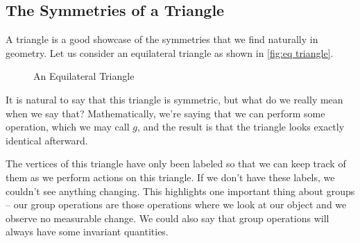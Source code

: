 \subsection{The Symmetries of a Triangle}
A triangle is a good showcase of the symmetries that we find naturally in geometry. Let us consider an equilateral triangle as shown in \autoref{fig:eq triangle}.

\begin{figure}[H]
    \centering



    \caption{An Equilateral Triangle}
    \label{fig:eq triangle}
\end{figure}

It is natural to say that this triangle is symmetric, but what do we really mean when we say that? Mathematically, we're saying that we can perform some operation, which we may call $g$, and the result is that the triangle looks exactly identical afterward. 

The vertices of this triangle have only been labeled so that we can keep track of them as we perform actions on this triangle. If we don't have these labels, we couldn't see anything changing. This highlights one important thing about groups -- our group operations are those operations where we look at our object and we observe no measurable change. We could also say that group operations will always have some invariant quantities.

